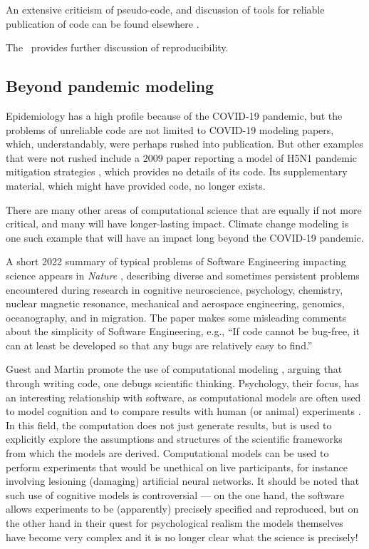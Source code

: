 \documentclass{comjnl}
\begin{document}
An extensive criticism of pseudo-code, and discussion of tools for reliable publication of code can be found elsewhere \cite{relit}. 

The \supplement\ provides further discussion of reproducibility.

\subsection{Beyond pandemic modeling}
\label{section-science-beyond-pandemic-modeling}

Epidemiology has a high profile because of the COVID-19 pandemic, but the problems of unreliable code are not limited to COVID-19 modeling papers, which, understandably, were perhaps rushed into publication. But other examples that were not rushed include a 2009 paper reporting a model of H5N1 pandemic mitigation strategies \cite{flu-model}, which provides no details of its code. Its supplementary material, which might have provided code, no longer exists.

There are many other areas of computational science that are equally if not more critical, and many will have longer-lasting impact. Climate change modeling is one such example that will have an impact long beyond the COVID-19 pandemic.

A short 2022 summary of typical problems of Software Engineering impacting science appears in \emph{Nature\/} \cite{nature-review}, describing diverse and sometimes persistent problems encountered during research in cognitive neuroscience, psychology, chemistry, nuclear magnetic resonance, mechanical and aerospace engineering, genomics, oceanography, and in migration. The paper \cite{nature-review}  makes some misleading comments about the simplicity of Software Engineering, e.g., ``If code cannot be bug-free, it can at least be developed so that any bugs are relatively easy to find.''

Guest and Martin promote the use of computational modeling \cite{psychological-modeling}, arguing that through writing code, one debugs scientific thinking. Psychology, their focus, has an interesting relationship with software, as computational models are often used to model cognition and to compare results with human (or animal) experiments \cite{psychological-modeling}. In this field, the computation does not just generate results, but is used to explicitly explore the assumptions and structures of the scientific frameworks from which the models are derived. Computational models can be used to perform experiments that would be unethical on live participants, for instance involving lesioning (damaging) artificial neural networks. It should be noted that such use of cognitive models is controversial --- on the one hand, the software allows experiments to be (apparently) precisely specified and reproduced, but on the other hand in their quest for psychological realism the models themselves have become very complex and it is no longer clear what the science is precisely!
\end{document}
